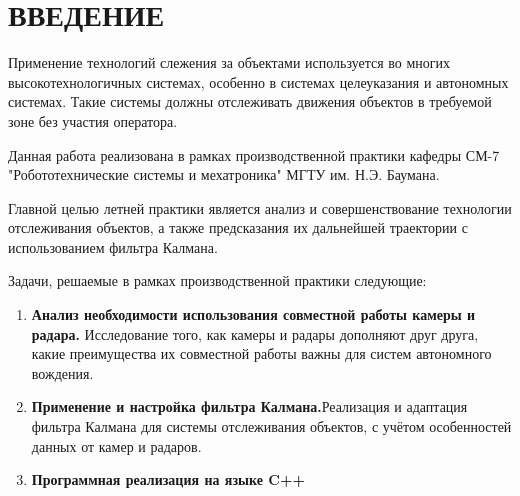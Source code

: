 \chapter*{ВВЕДЕНИЕ}

Применение технологий слежения за объектами используется во многих высокотехнологичных 
системах, особенно в системах целеуказания и автономных системах. Такие системы должны
отслеживать движения объектов в требуемой зоне без участия оператора.

Данная работа реализована в рамках производственной практики кафедры СМ-7 
"Робототехнические системы и мехатроника" МГТУ им. Н.Э. Баумана.

Главной целью летней практики является анализ и совершенствование технологии отслеживания
объектов, а также предсказания их дальнейшей траектории с использованием фильтра Калмана.

Задачи, решаемые в рамках производственной практики следующие:

\begin{enumerate}

	\item \textbf{Анализ необходимости использования совместной работы камеры и радара.}
	Исследование того, как камеры и радары дополняют друг друга, какие преимущества
	их совместной работы важны для систем автономного вождения. 
	\item \textbf{Применение и настройка фильтра Калмана.}Реализация и адаптация
	фильтра Калмана для системы отслеживания объектов, с учётом особенностей данных
	от камер и радаров.
	\item \textbf{Программная реализация на языке C++}

\end{enumerate}
